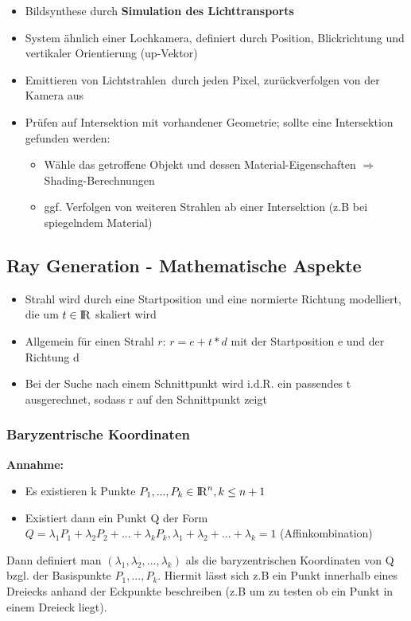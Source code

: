 \documentclass[10pt,a4paper]{article}
\def\realnumbers{{\rm I\!R}}
\begin{document}
	\begin{itemize}
		\item Bildsynthese durch \textbf{Simulation des Lichttransports}
		\item System ähnlich einer Lochkamera, definiert durch Position, Blickrichtung und vertikaler Orientierung (up-Vektor)
		\item Emittieren von \glqq Lichtstrahlen\grqq\ durch jeden Pixel, zurückverfolgen von der Kamera aus
		\item Prüfen auf Intersektion mit vorhandener Geometrie; sollte eine Intersektion gefunden werden:
			\begin{itemize}
				\item Wähle das getroffene Objekt und dessen Material-Eigenschaften $\Rightarrow$ Shading-Berechnungen
				\item ggf. Verfolgen von weiteren Strahlen ab einer Intersektion (z.B bei spiegelndem Material)
			\end{itemize}
	\end{itemize}

	\subsection{Ray Generation - Mathematische Aspekte}
	\label{rt:sub:ray_generation_mathematische_aspekte}

	\begin{itemize}
		\item Strahl wird durch eine Startposition und eine normierte Richtung modelliert, die um $t \in \realnumbers$ skaliert wird
		\item Allgemein für einen Strahl $r$: $r = e + t * d$ mit der Startposition e und der Richtung d
		\item Bei der Suche nach einem Schnittpunkt wird i.d.R. ein passendes t ausgerechnet, sodass r auf den Schnittpunkt zeigt
	\end{itemize}

	\subsubsection{Baryzentrische Koordinaten}
	\label{rt:ssub:baryzentrische_koordinaten}

	\textbf{Annahme:}
	\begin{itemize}
		\item Es existieren k Punkte $P_1, ..., P_k \in \realnumbers^n, k \leq n + 1$
		\item Existiert dann ein Punkt Q der Form $Q = \lambda_1P_1 + \lambda_2P_2 + ... + \lambda_kP_k, \lambda_1 + \lambda_2 + ... + \lambda_k = 1$ (\glqq Affinkombination\grqq)
	\end{itemize}
	Dann definiert man $(\lambda_1, \lambda_2, ..., \lambda_k)$ als die baryzentrischen Koordinaten von Q bzgl. der Basispunkte $P_1, ..., P_k$. Hiermit lässt sich z.B ein Punkt innerhalb eines Dreiecks anhand der Eckpunkte beschreiben (z.B um zu testen ob ein Punkt in einem Dreieck liegt).\\
\end{document}
